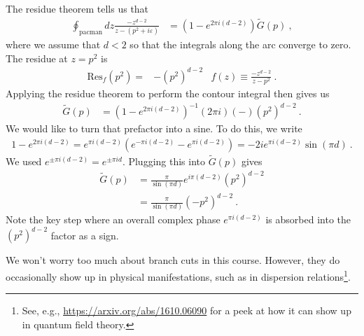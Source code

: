 \begin{example}
The residue theorem tells us that
\begin{align}
  \oint_\text{pacman} {dz} \frac{-z^{d-2}}{z-(p^2+i\varepsilon)}
  &=
  \left(1-e^{2\pi i(d-2)}\right) \tilde G(p) \ ,
\end{align}
where we assume that $d < 2$ so that the integrals along the arc converge to zero. The residue at $z=p^2$ is 
\begin{align}
  \text{Res}_f(p^2) =& -(p^2)^{d-2} 
  &
  f(z)\equiv 
  \frac{-z^{d-2}}{z-p^2} \ .
\end{align}
Applying the residue theorem to perform the contour integral then gives us
\begin{align}
  \tilde G(p) &= \left(1-e^{2\pi i(d-2)}\right)^{-1} (2\pi i) (-) (p^2)^{d-2}  \ .
\end{align}
We would like to turn that prefactor into a sine. To do this, we write
\begin{align}
  1-e^{2\pi i(d-2)}
  =
  e^{\pi i(d-2)}\left(e^{-\pi i(d-2)}-e^{\pi i(d-2)}\right)
  = -2i e^{\pi i(d-2)} \sin(\pi d) \ .
\end{align}
We used $e^{\pm\pi i(d-2)} = e^{\pm\pi id}$. Plugging this into $\tilde G(p)$ gives
\begin{align}
  \tilde G(p) &= 
  \frac{\pi}{\sin(\pi d)}
  e^{i\pi (d-2)}
  (p^2)^{d-2}
  \\
  & =
  \frac{\pi}{\sin(\pi d)} (-p^2)^{d-2} \ .
\end{align}
Note the key step where an overall complex phase $e^{\pi i(d-2)}$ is absorbed into the $(p^2)^{d-2}$ factor as a sign.
\end{example}

We won't worry too much about branch cuts in this course. However, they do occasionally show up in physical manifestations, such as in dispersion relations\footnote{See, e.g., \url{https://arxiv.org/abs/1610.06090} for a peek at how it can show up in quantum field theory.}.